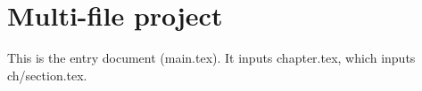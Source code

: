 \documentclass{article}
\begin{document}
\section{Multi-file project}
This is the entry document (main.tex). It inputs chapter.tex, which inputs ch/section.tex.

\end{document}

